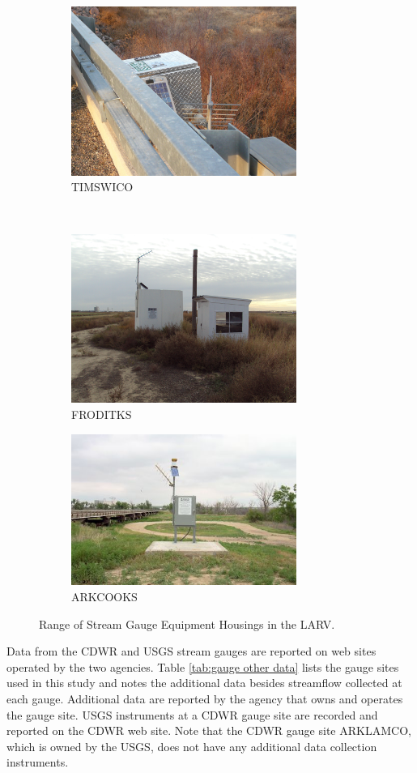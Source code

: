 \begin{linenumbers}
\begin{figure}[htbp]
	\begin{subfigure}[t]{0.5\textwidth}
		\centering
		\includegraphics[width=2.9in]{Figures/Photo/GaugeSite3}
		\caption{TIMSWICO}
	\end{subfigure}%
	~
	\begin{subfigure}[t]{0.5\textwidth}
		\centering
		\includegraphics[width=2.9in]{Figures/Photo/GaugeSite4}
		\caption{FRODITKS}
	\end{subfigure}
	
	\begin{subfigure}[t]{0.5\textwidth}
		\centering
		\includegraphics[width=2.9in]{Figures/Photo/GaugeSite6}
		\caption{ARKCOOKS}
	\end{subfigure}%
	\caption[Range of Stream Gauge Equipment Housings in the LARV.]{Range of Stream Gauge Equipment Housings in the LARV.}
	\label{pic:Housings}
\end{figure}

Data from the CDWR and USGS stream gauges are reported on web sites operated by the two agencies.  Table \ref{tab:gauge other data} lists the gauge sites used in this study and notes the additional data besides streamflow collected at each gauge.  Additional data are reported by the agency that owns and operates the gauge site.  USGS instruments at a CDWR gauge site are recorded and reported on the CDWR web site.  Note that the CDWR gauge site ARKLAMCO, which is owned by the USGS, does not have any additional data collection instruments.


\end{linenumbers}
